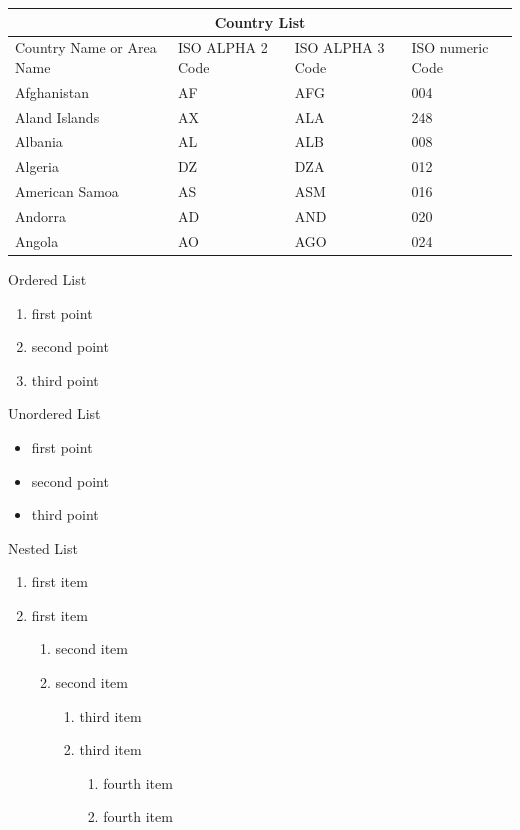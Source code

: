 \documentclass[10pt,a4paper]{report}
\theoremstyle{myn}
\theoremstyle{myu}
\begin{document}
\begin{tabular}{ |p{3cm}||p{3cm}|p{3cm}|p{3cm}|  }
 \hline
 \multicolumn{4}{|c|}{Country List} \\
 \hline
 Country Name or Area Name& ISO ALPHA 2 Code &ISO ALPHA 3 Code&ISO numeric Code\\
 \hline
 Afghanistan   & AF    &AFG&   004\\
 Aland Islands&   AX  & ALA   &248\\
 Albania &AL & ALB&  008\\
 Algeria    &DZ & DZA&  012\\
 American Samoa&   AS  & ASM&016\\
 Andorra& AD  & AND   &020\\
 Angola& AO  & AGO&024\\
 \hline
\end{tabular}

\begin{center}
\textsf{Ordered List}
\begin{enumerate}  
\item first point  
\item second point  
\item third point
\end{enumerate} 
\end{center}

\begin{center}
\textsf{Unordered List}
\begin{itemize}  
\item first point  
\item second point  
\item third point
\end{itemize} 
\end{center}

\begin{center}
\textsf{Nested List}
\begin{enumerate}
   \item first item
   \item first item
   \begin{enumerate}
     \item second item
     \item second item
     \begin{enumerate}
       \item third item
       \item third item
       \begin{enumerate}
         \item fourth item
         \item fourth item
       \end{enumerate}
     \end{enumerate}
   \end{enumerate}
 \end{enumerate}
\end{center}
 


\end{document}
